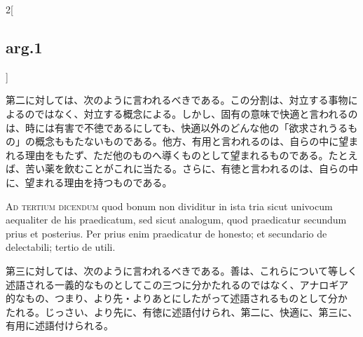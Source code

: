 \documentclass[paper=a4paper,fontsize=10pt,jafontsize=9pt,titlepage]{jlreq}
\begin{document}
\begin{paracol}{2}[\subsection{arg.1}]
\switchcolumn

第二に対しては、次のように言われるべきである。この分割は、対立する事物によるのではなく、対立する概念による。しかし、固有の意味で快適と言われるのは、時には有害で不徳であるにしても、快適以外のどんな他の「欲求されうるもの」の概念ももたないものである。他方、有用と言われるのは、自らの中に望まれる理由をもたず、ただ他のものへ導くものとして望まれるものである。たとえば、苦い薬を飲むことがこれに当たる。さらに、有徳と言われるのは、自らの中に、望まれる理由を持つものである。

\switchcolumn*[\subsection{ad.3}]

{\scshape Ad tertium dicendum} quod bonum non dividitur in ista tria sicut
 univocum aequaliter de his praedicatum, sed sicut analogum, quod
 praedicatur secundum prius et posterius. Per prius enim praedicatur de
 honesto; et secundario de delectabili; tertio de utili.

\switchcolumn

第三に対しては、次のように言われるべきである。善は、これらについて等しく
 述語される一義的なものとしてこの三つに分かたれるのではなく、アナロギア
 的なもの、つまり、より先・よりあとにしたがって述語されるものとして分か
 たれる。じっさい、より先に、有徳に述語付けられ、第二に、快適に、第三に、
 有用に述語付けられる。

\end{paracol}
\end{document}
